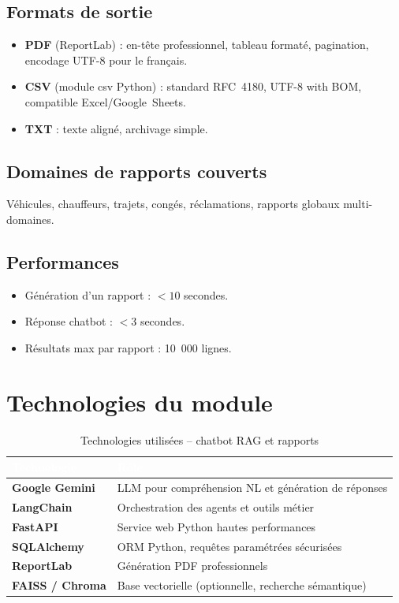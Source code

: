\documentclass[12pt,a4paper]{report}
\newcommand{\thead}[1]{\cellcolor{tablehead}\textcolor{white}{\textbf{#1}}}
\begin{document}
\subsection{Formats de sortie}

\begin{itemize}
  \item \textbf{PDF} (ReportLab) : en-tête professionnel, tableau formaté,
        pagination, encodage UTF-8 pour le français.
  \item \textbf{CSV} (module csv Python) : standard RFC~4180, UTF-8 with BOM,
        compatible Excel/Google~Sheets.
  \item \textbf{TXT} : texte aligné, archivage simple.
\end{itemize}

\subsection{Domaines de rapports couverts}

Véhicules, chauffeurs, trajets, congés, réclamations, rapports globaux
multi-domaines.

\subsection{Performances}

\begin{itemize}
  \item Génération d'un rapport : $< 10$ secondes.
  \item Réponse chatbot : $< 3$ secondes.
  \item Résultats max par rapport : 10~000 lignes.
\end{itemize}

\section{Technologies du module}
\label{sec:ch7-technologies}

\begin{table}[H]
  \centering
  \caption{Technologies utilisées -- chatbot RAG et rapports}
  \label{tab:techno_chatbot}
  \begin{tabularx}{\textwidth}{|l|Y|}
    \hline
    \thead{Technologie} & \thead{Rôle} \\
    \hline
    \textbf{Google Gemini} & LLM pour compréhension NL et génération de réponses \\
    \textbf{LangChain} & Orchestration des agents et outils métier \\
    \textbf{FastAPI} & Service web Python hautes performances \\
    \textbf{SQLAlchemy} & ORM Python, requêtes paramétrées sécurisées \\
    \textbf{ReportLab} & Génération PDF professionnels \\
    \textbf{FAISS / Chroma} & Base vectorielle (optionnelle, recherche sémantique) \\
    \hline
  \end{tabularx}
\end{table}
\end{document}
